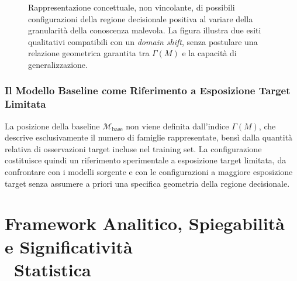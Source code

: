 \begin{figure}[H]
    \caption{Rappresentazione concettuale, non vincolante, di possibili configurazioni della regione decisionale positiva al variare della granularità della conoscenza malevola. La figura illustra due esiti qualitativi compatibili con un \textit{domain shift}, senza postulare una relazione geometrica garantita tra $\Gamma(M)$ e la capacità di generalizzazione.}
    \label{fig:domain_shift_granularity}
\end{figure}


\subsubsection{Il Modello Baseline come Riferimento a Esposizione Target Limitata}
\label{subsubsec:baseline_riferimento_granularita}
La posizione della baseline $\mathcal{M}_{\text{base}}$ non viene definita dall'indice $\Gamma(M)$, che descrive esclusivamente il numero di famiglie rappresentate, bensì dalla quantità relativa di osservazioni target incluse nel training set. La configurazione costituisce quindi un riferimento sperimentale a esposizione target limitata, da confrontare con i modelli sorgente e con le configurazioni a maggiore esposizione target senza assumere a priori una specifica geometria della regione decisionale.

\section[Framework Analitico, Spiegabilità e Significatività Statistica]{Framework Analitico, Spiegabilità e Significatività \\\ Statistica}
\label{sec:framework_analitico}


